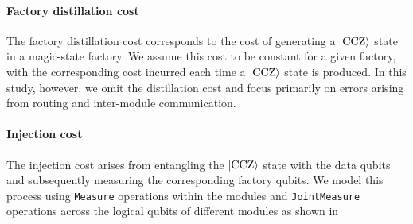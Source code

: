 \documentclass[sigconf]{acmart}
\newcommand{\siyi}[1]{%
        \textcolor{cyan}{\textbf{Siyi:} #1}%
    }
\newcommand{\siyi}[1]{}
\begin{document}

\paragraph{Factory distillation cost}
\label{subsub:fact_dist_cost}
The factory distillation cost corresponds to the cost of generating a $\ket{\mathrm{CCZ}}$ state in a magic-state factory. We assume this cost to be constant for a given factory, with the corresponding cost incurred each time a $\ket{\mathrm{CCZ}}$ state is produced. In this study, however, we omit the distillation cost and focus primarily on errors arising from routing and inter-module communication.

%
\paragraph{Injection cost}
\label{subsub:inj_cost}
The injection cost arises from entangling the $\ket{\mathrm{CCZ}}$ state with the data qubits and subsequently measuring the corresponding factory qubits. We model this process using \texttt{Measure} operations within the modules and \texttt{JointMeasure} operations across the logical qubits of different modules as shown in \cite{bicycle_compiler}
\end{document}
